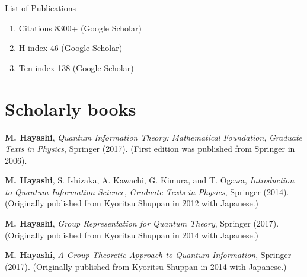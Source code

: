 \documentclass[a4paper,12pt,oneside]{article}
\begin{document}
{\Huge List of Publications}
\begin{enumerate}
\item Citations 8300+ (Google Scholar) 
\item H-index 46 (Google Scholar)
\item Ten-index 138 (Google Scholar)
\end{enumerate}

\section{Scholarly books}
\begin{enumerate}
\textbf{M. Hayashi},
{\em Quantum Information Theory: Mathematical Foundation}, 
{\em Graduate Texts in Physics}, Springer (2017).
(First edition was published from Springer in 2006).


\textbf{M. Hayashi}, S. Ishizaka, A. Kawachi, G. Kimura, and T. Ogawa, 
{\em Introduction to Quantum Information Science}, 
{\em Graduate Texts in Physics}, Springer (2014).
(Originally published from Kyoritsu Shuppan in 2012 with Japanese.)

\textbf{M. Hayashi},
{\em Group Representation for Quantum Theory}, 
Springer (2017). 
(Originally published from Kyoritsu Shuppan in 2014 with Japanese.)

\textbf{M. Hayashi},
{\em A Group Theoretic Approach to Quantum Information}, 
Springer (2017). 
(Originally published from Kyoritsu Shuppan in 2014 with Japanese.)

\end{enumerate}
\end{document}
